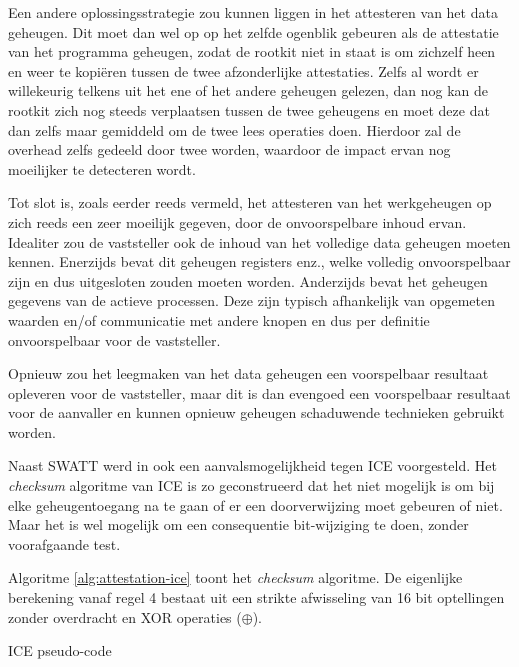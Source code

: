 Een andere oplossingsstrategie zou kunnen liggen in het attesteren van het data
geheugen. Dit moet dan wel op op het zelfde ogenblik gebeuren als de attestatie
van het programma geheugen, zodat de rootkit niet in staat is om zichzelf heen
en weer te kopi\"eren tussen de twee afzonderlijke attestaties. Zelfs al wordt
er willekeurig telkens uit het ene of het andere geheugen gelezen, dan nog kan
de rootkit zich nog steeds verplaatsen tussen de twee geheugens en moet deze
dat dan zelfs maar gemiddeld om de twee lees operaties doen. Hierdoor zal de
overhead zelfs gedeeld door twee worden, waardoor de impact ervan nog
moeilijker te detecteren wordt.

Tot slot is, zoals eerder reeds vermeld, het attesteren van het werkgeheugen op
zich reeds een zeer moeilijk gegeven, door de onvoorspelbare inhoud ervan.
Idealiter zou de vaststeller ook de inhoud van het volledige data geheugen
moeten kennen. Enerzijds bevat dit geheugen registers enz., welke volledig
onvoorspelbaar zijn en dus uitgesloten zouden moeten worden. Anderzijds bevat
het geheugen gegevens van de actieve processen. Deze zijn typisch afhankelijk
van opgemeten waarden en/of communicatie met andere knopen en dus per definitie
onvoorspelbaar voor de vaststeller.

Opnieuw zou het leegmaken van het data geheugen een voorspelbaar resultaat
opleveren voor de vaststeller, maar dit is dan evengoed een voorspelbaar
resultaat voor de aanvaller en kunnen opnieuw geheugen schaduwende technieken
gebruikt worden.

Naast SWATT werd in \cite{castelluccia2009difficulty} ook een
aanvalsmogelijkheid tegen ICE voorgesteld. Het \emph{checksum} algoritme van
ICE is zo geconstrueerd dat het niet mogelijk is om bij elke geheugentoegang na
te gaan of er een doorverwijzing moet gebeuren of niet. Maar het is wel
mogelijk om een consequentie bit-wijziging te doen, zonder voorafgaande test.

Algoritme \ref{alg:attestation-ice} toont het \emph{checksum} algoritme. De
eigenlijke berekening vanaf regel 4 bestaat uit een strikte afwisseling van
16 bit optellingen zonder overdracht en XOR operaties ($\oplus$).

\begin{algorithm}
\begin{algorithmic}[1]
     
     
       
      
        
  \EndFor
\end{algorithmic}
\caption{ICE pseudo-code\label{alg:attestation-ice}}
\end{algorithm}

